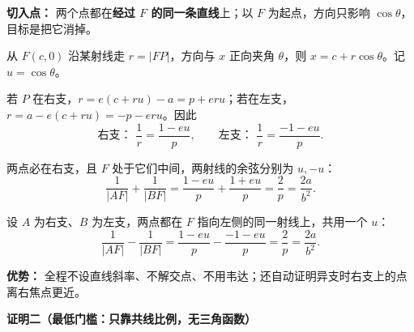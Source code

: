 \begin{proofbox}
  \textbf{切入点：} 两个点都在\textbf{经过 $F$ 的同一条直线}上；以 $F$ 为起点，方向只影响 $\cos\theta$，目标是把它消掉。

  从 $F(c,0)$ 沿某射线走 $r=|FP|$，方向与 $x$ 正向夹角 $\theta$，则 $x=c+r\cos\theta$。记 $u=\cos\theta$。
  \begin{description}[style=nextline,leftmargin=2.8em,labelsep=0.5em,itemsep=0.4em]
    \item[\textbf{一步：写出射线上的倒数。}]
    若 $P$ 在右支，$r=e(c+ru)-a=p+eru$；若在左支，$r=a-e(c+ru)=-p-eru$。因此
    \[
      \boxed{\text{右支： }\frac1r=\frac{1-eu}{p}},\qquad
      \boxed{\text{左支： }\frac1r=\frac{-1-eu}{p}}.
    \]
    \item[\textbf{同支：相反方向，直接加。}]
    两点必在右支，且 $F$ 处于它们中间，两射线的余弦分别为 $u,-u$：
    \[
      \frac1{|AF|}+\frac1{|BF|}
      =\frac{1-eu}{p}+\frac{1+eu}{p}
      =\boxed{\frac2p=\frac{2a}{b^2}}.
    \]
    \item[\textbf{异支：同一方向，直接减。}]
    设 $A$ 为右支、$B$ 为左支，两点都在 $F$ 指向左侧的同一射线上，共用一个 $u$：
    \[
      \frac1{|AF|}-\frac1{|BF|}
      =\frac{1-eu}{p}-\frac{-1-eu}{p}
      =\boxed{\frac2p=\frac{2a}{b^2}}.
    \]
  \end{description}
  \textbf{优势：} 全程不设直线斜率、不解交点、不用韦达；还自动证明异支时右支上的点离右焦点更近。

  \medskip
\end{proofbox}\clearpage\begin{proofbox}
  \textbf{\textcolor{CProof}{证明二（最低门槛：只靠共线比例，无三角函数）}}


\end{proofbox}
